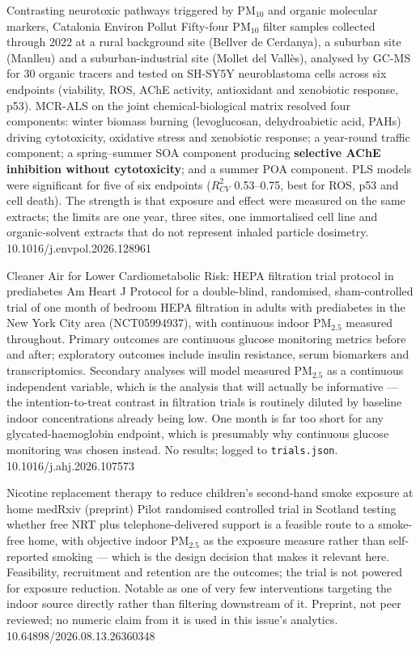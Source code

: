 \documentclass[10pt]{article}
\begin{document}
{Contrasting neurotoxic pathways triggered by PM$_{10}$ and organic molecular markers, Catalonia}
{Environ Pollut}
{Fifty-four PM$_{10}$ filter samples collected through 2022 at a rural background site
(Bellver de Cerdanya), a suburban site (Manlleu) and a suburban-industrial site (Mollet
del Vall\`es), analysed by GC-MS for 30 organic tracers and tested on SH-SY5Y
neuroblastoma cells across six endpoints (viability, ROS, AChE activity, antioxidant and
xenobiotic response, p53). MCR-ALS on the joint chemical-biological matrix resolved four
components: winter biomass burning (levoglucosan, dehydroabietic acid, PAHs) driving
cytotoxicity, oxidative stress and xenobiotic response; a year-round traffic component; a
spring--summer SOA component producing \textbf{selective AChE inhibition without
cytotoxicity}; and a summer POA component. PLS models were significant for five of six
endpoints ($R^2_{CV}$ 0.53--0.75, best for ROS, p53 and cell death). The strength is that
exposure and effect were measured on the same extracts; the limits are one year, three
sites, one immortalised cell line and organic-solvent extracts that do not represent
inhaled particle dosimetry.}
{10.1016/j.envpol.2026.128961}


{Cleaner Air for Lower Cardiometabolic Risk: HEPA filtration trial protocol in prediabetes}
{Am Heart J}
{Protocol for a double-blind, randomised, sham-controlled trial of one month of bedroom
HEPA filtration in adults with prediabetes in the New York City area (NCT05994937), with
continuous indoor PM$_{2.5}$ measured throughout. Primary outcomes are continuous glucose
monitoring metrics before and after; exploratory outcomes include insulin resistance,
serum biomarkers and transcriptomics. Secondary analyses will model measured PM$_{2.5}$
as a continuous independent variable, which is the analysis that will actually be
informative --- the intention-to-treat contrast in filtration trials is routinely diluted
by baseline indoor concentrations already being low. One month is far too short for any
glycated-haemoglobin endpoint, which is presumably why continuous glucose monitoring was
chosen instead. No results; logged to \texttt{trials.json}.}
{10.1016/j.ahj.2026.107573}


{Nicotine replacement therapy to reduce children's second-hand smoke exposure at home}
{medRxiv (preprint)}
{Pilot randomised controlled trial in Scotland testing whether free NRT plus
telephone-delivered support is a feasible route to a smoke-free home, with objective
indoor PM$_{2.5}$ as the exposure measure rather than self-reported smoking --- which is
the design decision that makes it relevant here. Feasibility, recruitment and retention
are the outcomes; the trial is not powered for exposure reduction. Notable as one of very
few interventions targeting the indoor source directly rather than filtering downstream
of it. Preprint, not peer reviewed; no numeric claim from it is used in this issue's
analytics.}
{10.64898/2026.08.13.26360348}
\end{document}
